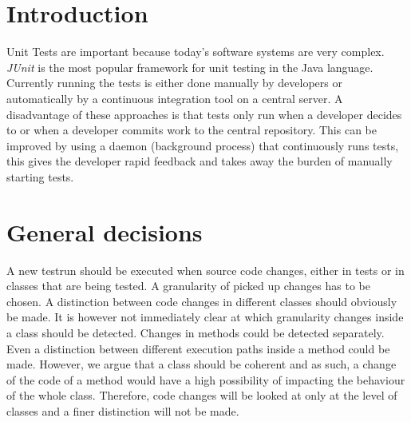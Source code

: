 \documentclass[i2]{oss}
\newcommand{\junit}{\emph{JUnit }}
\begin{document}

\maketitlepage
\newpage
\tableofcontents
\pagebreak




\section*{Introduction}
\label{ssec:introduction}

Unit Tests are important because today's software systems are very 
complex.
\junit is the most popular framework for unit testing in the Java 
language.
Currently running the tests is either done manually by developers or
automatically by a continuous integration tool on a central server.
A disadvantage of these approaches is that tests only run when a 
developer decides to or when a developer commits work to the central 
repository.
This can be improved by using a daemon (background process) that continuously runs tests, this gives the developer rapid feedback and 
takes away the burden of manually starting tests.

\section{General decisions}
\label{ssec:general-decisions}

A new testrun should be executed when source code changes, either in tests or in classes that are being tested. 
A granularity of picked up changes has to be chosen.
A distinction between code changes in different classes should obviously be made.
It is however not immediately clear at which granularity changes inside a class should be detected.
Changes in methods could be detected separately.
Even a distinction between different execution paths inside a method could be made.
However, we argue that a class should be coherent and as such, a change of the code of a method would have a high possibility of impacting the behaviour of the whole class.
Therefore, code changes will be looked at only at the level of classes and a finer distinction will not be made.
\end{document}
